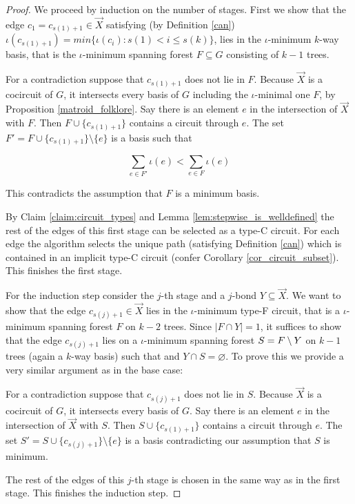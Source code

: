 \begin{proof}
	We proceed by induction on the number of stages. First we show that the edge $c_1 = c_{s(1)+1} \in \vec{X}$ satisfying (by Definition \ref{can}) $\iota(c_{s(1)+1}) = min\{ \iota(c_i) : s(1) < i \leq s(k) \}$, lies in the $\iota$-minimum $k$-way basis, that is the $\iota$-minimum spanning forest $F \subseteq G$ consisting of $k-1$ trees.

	For a contradiction suppose that $c_{s(1)+1}$ does not lie in $F$. Because $\vec X$ is a cocircuit of $G$, it intersects every basis of $G$ including the $\iota$-minimal one $F$, by Proposition \ref{matroid_folklore}. Say there is an element $e$ in the intersection of $\vec X$ with $F$. Then $F \cup \{c_{s(1)+1}\}$ contains a circuit through $e$. The set $F' = F \cup \{c_{s(1)+1}\} \setminus \{e\}$ is a basis such that

\[
	\sum_{e \in F'} \iota(e) < \sum_{e \in F} \iota(e)
\]

This contradicts the assumption that $F$ is a minimum basis.

	By Claim \ref{claim:circuit_types} and Lemma \ref{lem:stepwise_is_welldefined} the rest of the edges of this first stage can be selected as a type-C circuit. For each edge the algorithm selects the unique path (satisfying Definition \ref{can}) which is contained in an implicit type-C circuit (confer Corollary \ref{cor_circuit_subset}). This finishes the first stage.

	For the induction step consider the $j$-th stage and a $j$-bond $Y \subseteq \vec X$. We want to show that the edge $c_{s(j)+1} \in \vec X$ lies in the $\iota$-minimum type-F circuit, that is a $\iota$-minimum spanning forest $F$ on $k-2$ trees. Since $\lvert F \cap Y \rvert = 1$, it suffices to show that the edge $c_{s(j)+1}$ lies on a $\iota$-minimum spanning forest $S = F \setminus Y$ on $k-1$ trees (again a $k$-way basis) such that and $Y \cap S = \varnothing$. To prove this we provide a very similar argument as in the base case:

	For a contradiction suppose that $c_{s(j)+1}$ does not lie in $S$. Because $\vec X$ is a cocircuit of $G$, it intersects every basis of $G$. Say there is an element $e$ in the intersection of $\vec X$ with $S$. Then $S \cup \{c_{s(1)+1}\}$ contains a circuit through $e$. The set $S' = S \cup \{c_{s(j)+1}\} \setminus \{e\}$ is a basis contradicting our assumption that $S$ is minimum.


	The rest of the edges of this $j$-th stage is chosen in the same way as in the first stage. This finishes the induction step.
\end{proof}

